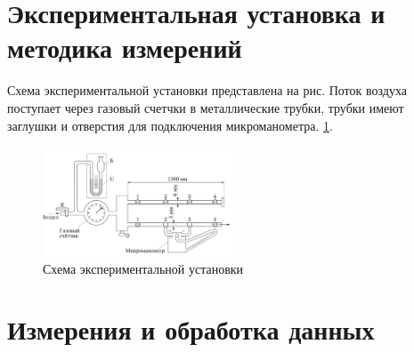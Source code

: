\documentclass[a4paper,12pt]{article} %
\begin{document}
\section{Экспериментальная установка и методика измерений}
Схема экспериментальной установки представлена на рис. Поток воздуха поступает через газовый счетчки в металлические трубки, трубки имеют заглушки и отверстия для подключения микроманометра.  \ref{установка}. 
\begin{figure}[h!]
\begin{center}
\includegraphics[width=0.5\textwidth]{Установка}
\end{center}
\caption{Схема экспериментальной установки} \label{установка}
\end{figure}
\section{Измерения и обработка данных}
\end{document}
